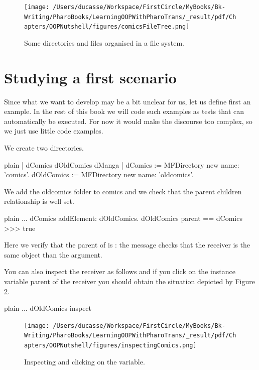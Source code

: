 \documentclass[10pt,twoside,english]{_support/latex/sbabook/sbabook}
\begin{document}
\begin{figure}

\begin{center}
\texttt{[image: /Users/ducasse/Workspace/FirstCircle/MyBooks/Bk-Writing/PharoBooks/LearningOOPWithPharoTrans/\_result/pdf/Chapters/OOPNutshell/figures/comicsFileTree.png]}\caption{Some directories and files organised in a file system.\label{figdirectories}}\end{center}
\end{figure}

\section{Studying a first scenario}
Since what we want to develop may be a bit unclear for us, let us define first an example. In the rest of this book we will code such examples as tests that can automatically be executed. For now it would make the discourse too complex, so we just use little code examples. 

We create two directories.

\begin{displaycode}{plain}
| dComics dOldComics dManga |
dComics := MFDirectory new name: 'comics'.
dOldComics := MFDirectory new name: 'oldcomics'.
\end{displaycode}

We add the oldcomics folder to comics and we check that the parent children relationship is well set. 

\begin{displaycode}{plain}
	...
dComics addElement: dOldComics. 
dOldComics parent == dComics
>>> true
\end{displaycode}

Here we verify that the parent of  is : the message \textcode{ == } checks that the receiver is the same object than the argument.  

You can also inspect the receiver as follows and if you click on the instance variable parent of the receiver you should obtain the situation depicted by Figure \ref{inspectingComics}.

\begin{displaycode}{plain}
	...
dOldComics inspect
\end{displaycode}


\begin{figure}

\begin{center}
\texttt{[image: /Users/ducasse/Workspace/FirstCircle/MyBooks/Bk-Writing/PharoBooks/LearningOOPWithPharoTrans/\_result/pdf/Chapters/OOPNutshell/figures/inspectingComics.png]}\caption{Inspecting  and clicking on the  variable. \label{inspectingComics}}\end{center}
\end{figure}
\end{document}
